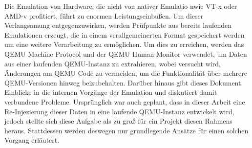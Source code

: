 
\Abstract
Die Emulation von Hardware, die nicht von nativer Emulatio nwie VT-x oder AMD-v profitiert, führt zu enormen Leistungseinbußen.
Um dieser Verlangsamung entgegenzuwirken, werden Prüfpunkte aus bereits laufenden Emulationen erzeugt,
die in einem verallgemeinerten Format gespeichert werden um eine weitere Verarbeitung zu ermöglichen.
Um dies zu erreichen, werden das QEMU Machine Protocol und der QEMU Human Monitor verwendet, um Daten aus einer laufenden QEMU-Instanz zu extrahieren,
wobei versucht wird, Änderungen am QEMU-Code zu vermeiden, um die Funktionalität über mehrere QEMU-Versionen hinweg beizubehalten.
Darüber hinaus gibt dieses Dokument Einblicke in die internen Vorgänge der Emulation und diskutiert damit verbundene Probleme.
Ursprünglich war auch geplant, dass in dieser Arbeit eine Re-Injezierung dieser Daten in eine laufende QEMU-Instanz entwickelt wird,
jedoch stellte sich diese Aufgabe als zu groß für ein Projekt diesen Rahmens heraus.
Stattdessen werden deswegen nur grundlegende Ansätze für einen solchen Vorgang erläutert.